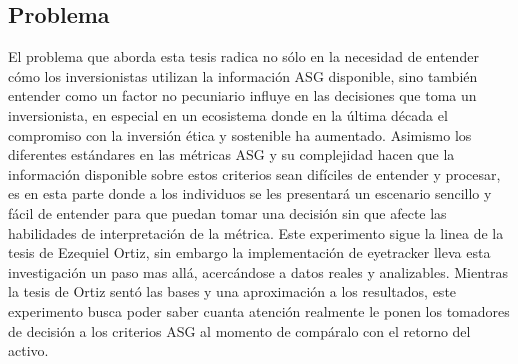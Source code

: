 \subsection{Problema}
El problema que aborda esta tesis radica no sólo en la necesidad de entender cómo los inversionistas utilizan la información ASG disponible, sino también entender como un factor no pecuniario influye en las decisiones que toma un inversionista, en especial en un ecosistema donde en la última década el compromiso con la inversión ética y sostenible ha aumentado. 
Asimismo los diferentes estándares en las métricas ASG y su complejidad hacen que la información disponible sobre estos criterios sean difíciles de entender y procesar, es en esta parte donde a los individuos se les presentará un escenario sencillo y fácil de entender para que puedan tomar una decisión sin que afecte las habilidades de interpretación de la métrica.
Este experimento sigue la linea de la tesis de Ezequiel Ortiz, sin embargo la implementación de eyetracker lleva esta investigación un paso mas allá, acercándose a datos reales y analizables. Mientras la tesis de Ortiz sentó las bases y una aproximación a los resultados, este experimento busca poder saber cuanta atención realmente le ponen los tomadores de decisión a los criterios ASG al momento de compáralo con el retorno del activo.